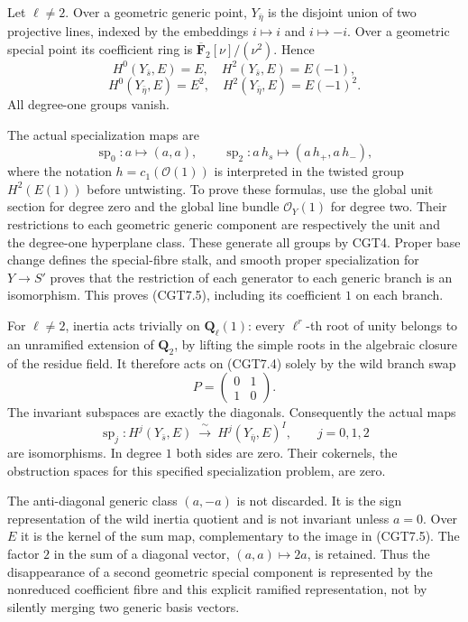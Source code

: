 Let \(\ell\ne2\). Over a geometric generic point, \(Y_{\bar\eta}\) is
the disjoint union of two projective lines, indexed by the embeddings
\(i\mapsto i\) and \(i\mapsto-i\). Over a geometric special point its
coefficient ring is \(\overline{\mathbf F}_2[\nu]/(\nu^2)\). Hence \[
H^0(Y_{\bar s},E)=E,\quad H^2(Y_{\bar s},E)=E(-1),
\] \[
H^0(Y_{\bar\eta},E)=E^2,\quad
H^2(Y_{\bar\eta},E)=E(-1)^2.
\tag{CGT7.4}
\] All degree-one groups vanish.

The actual specialization maps are \[
\operatorname{sp}_0:a\longmapsto(a,a),\qquad
\operatorname{sp}_2:a\,h_s\longmapsto(a\,h_+,a\,h_-),
\tag{CGT7.5}
\] where the notation \(h=c_1(\mathcal O(1))\) is interpreted in the
twisted group \(H^2(E(1))\) before untwisting. To prove these formulas,
use the global unit section for degree zero and the global line bundle
\(\mathcal O_Y(1)\) for degree two. Their restrictions to each geometric
generic component are respectively the unit and the degree-one
hyperplane class. These generate all groups by CGT4. Proper base change
defines the special-fibre stalk, and smooth proper specialization for
\(Y\to S'\) proves that the restriction of each generator to each
generic branch is an isomorphism. This proves (CGT7.5), including its
coefficient \(1\) on each branch.

For \(\ell\ne2\), inertia acts trivially on \(\mathbf Q_\ell(1)\): every
\(\ell^r\)-th root of unity belongs to an unramified extension of
\(\mathbf Q_2\), by lifting the simple roots in the algebraic closure of
the residue field. It therefore acts on (CGT7.4) solely by the wild
branch swap \[
P=\begin{pmatrix}0&1\\1&0\end{pmatrix}.
\tag{CGT7.6}
\] The invariant subspaces are exactly the diagonals. Consequently the
actual maps \[
\boxed{\operatorname{sp}_j:
H^j(Y_{\bar s},E)\ \xrightarrow{\ \sim\ }\
H^j(Y_{\bar\eta},E)^I,\qquad j=0,1,2}
\tag{CGT7.7}
\] are isomorphisms. In degree \(1\) both sides are zero. Their
cokernels, the obstruction spaces for this specified specialization
problem, are zero.

The anti-diagonal generic class \((a,-a)\) is not discarded. It is the
sign representation of the wild inertia quotient and is not invariant
unless \(a=0\). Over \(E\) it is the kernel of the sum map,
complementary to the image in (CGT7.5). The factor \(2\) in the sum of a
diagonal vector, \((a,a)\mapsto2a\), is retained. Thus the disappearance
of a second geometric special component is represented by the nonreduced
coefficient fibre and this explicit ramified representation, not by
silently merging two generic basis vectors.

